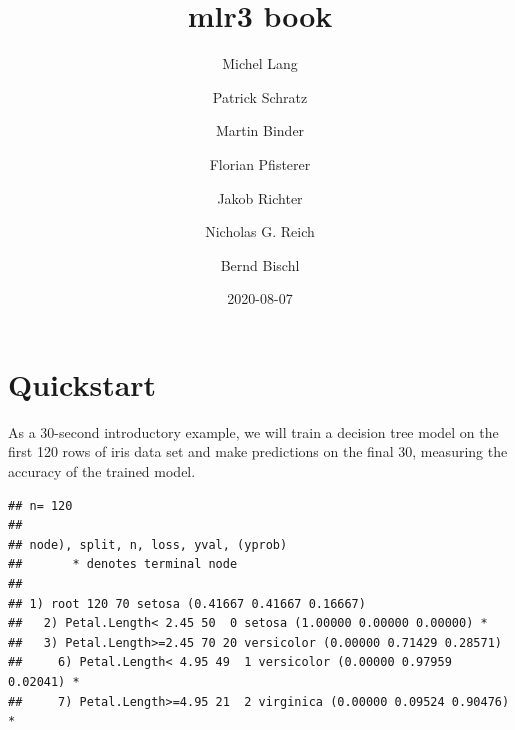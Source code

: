 \documentclass[]{scrbook}
\title{mlr3 book}
\author{Michel Lang \and Patrick Schratz \and Martin Binder \and Florian Pfisterer \and Jakob Richter \and Nicholas G. Reich \and Bernd Bischl}
\date{2020-08-07}
\newenvironment{Shaded}{\begin{snugshade}}{\end{snugshade}}
\newcommand{\CommentTok}[1]{\textcolor[rgb]{0.56,0.35,0.01}{\textit{#1}}}
\newcommand{\DataTypeTok}[1]{\textcolor[rgb]{0.13,0.29,0.53}{#1}}
\newcommand{\DecValTok}[1]{\textcolor[rgb]{0.00,0.00,0.81}{#1}}
\newcommand{\KeywordTok}[1]{\textcolor[rgb]{0.13,0.29,0.53}{\textbf{#1}}}
\newcommand{\NormalTok}[1]{#1}
\newcommand{\OperatorTok}[1]{\textcolor[rgb]{0.81,0.36,0.00}{\textbf{#1}}}
\newcommand{\StringTok}[1]{\textcolor[rgb]{0.31,0.60,0.02}{#1}}
\renewenvironment{Shaded} {\begin{snugshade}\small} {\end{snugshade}}
\begin{document}
\maketitle

{
\hypersetup{linkcolor=}
\setcounter{tocdepth}{1}
\tableofcontents
}
\hypertarget{quickstart}{%
\chapter*{Quickstart}\label{quickstart}}

As a 30-second introductory example, we will train a decision tree model on the first 120 rows of iris data set and make predictions on the final 30, measuring the accuracy of the trained model.

\begin{Shaded}
\end{Shaded}

\begin{verbatim}
## n= 120 
## 
## node), split, n, loss, yval, (yprob)
##       * denotes terminal node
## 
## 1) root 120 70 setosa (0.41667 0.41667 0.16667)  
##   2) Petal.Length< 2.45 50  0 setosa (1.00000 0.00000 0.00000) *
##   3) Petal.Length>=2.45 70 20 versicolor (0.00000 0.71429 0.28571)  
##     6) Petal.Length< 4.95 49  1 versicolor (0.00000 0.97959 0.02041) *
##     7) Petal.Length>=4.95 21  2 virginica (0.00000 0.09524 0.90476) *
\end{verbatim}

\begin{Shaded}
\end{Shaded}
\end{document}
